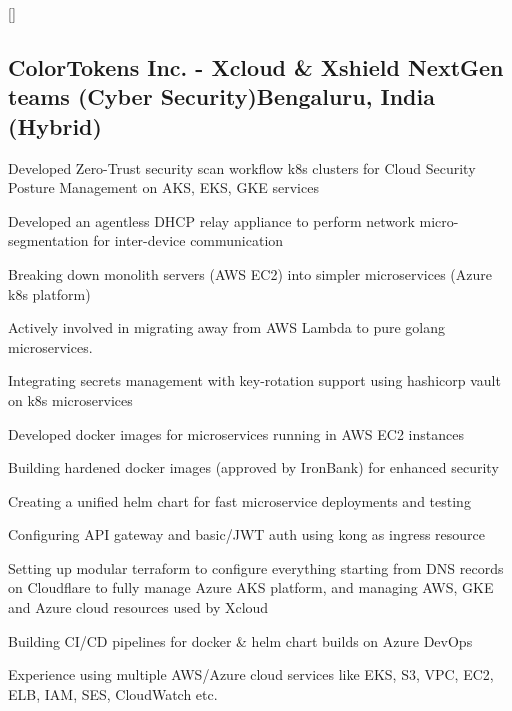 \documentclass[letter,10pt]{article}
\begin{document}
\titlespacing*{\subsubsection}{0em}{0em}{0em}
\titleformat{\subsubsection}{\itshape}{}{0em}{}[]


\subsection{ColorTokens Inc. - Xcloud \& Xshield NextGen teams (Cyber Security)\hfill Bengaluru, India (Hybrid)}
\begin{zitemize}
\item Developed Zero-Trust security scan workflow k8s clusters for Cloud Security Posture Management on AKS, EKS, GKE services
\item Developed an agentless DHCP relay appliance to perform network micro-segmentation for inter-device communication
\item Breaking down monolith servers (AWS EC2) into simpler microservices (Azure k8s platform)
\item Actively involved in migrating away from AWS Lambda to pure golang microservices.
\item Integrating secrets management with key-rotation support using hashicorp vault on k8s microservices
\item Developed docker images for microservices running in AWS EC2 instances
\item Building hardened docker images (approved by IronBank) for enhanced security
\item Creating a unified helm chart for fast microservice deployments and testing
\item Configuring API gateway and basic/JWT auth using kong as ingress resource
\item Setting up modular terraform to configure everything starting from DNS records on Cloudflare to fully  manage Azure AKS platform, and managing AWS, GKE and Azure cloud resources used by Xcloud
\item Building CI/CD pipelines for docker \& helm chart builds on Azure DevOps
\item Experience using multiple AWS/Azure cloud services like EKS, S3, VPC, EC2, ELB, IAM, SES, CloudWatch etc.
\end{zitemize}
\end{document}
